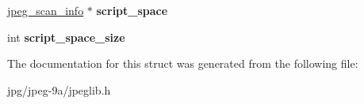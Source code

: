 \begin{DoxyCompactItemize}
\item 
\hypertarget{structjpeg__compress__struct_ab4a2c220ed2cda1b0d4c88518d02a229}{\hyperlink{structjpeg__scan__info}{jpeg\+\_\+scan\+\_\+info} $\ast$ {\bfseries script\+\_\+space}}\label{structjpeg__compress__struct_ab4a2c220ed2cda1b0d4c88518d02a229}

\item 
\hypertarget{structjpeg__compress__struct_ae50a683b4baddef6571900ca6240b1a3}{int {\bfseries script\+\_\+space\+\_\+size}}\label{structjpeg__compress__struct_ae50a683b4baddef6571900ca6240b1a3}

\end{DoxyCompactItemize}


The documentation for this struct was generated from the following file\+:\begin{DoxyCompactItemize}
\item 
jpg/jpeg-\/9a/jpeglib.\+h\end{DoxyCompactItemize}
